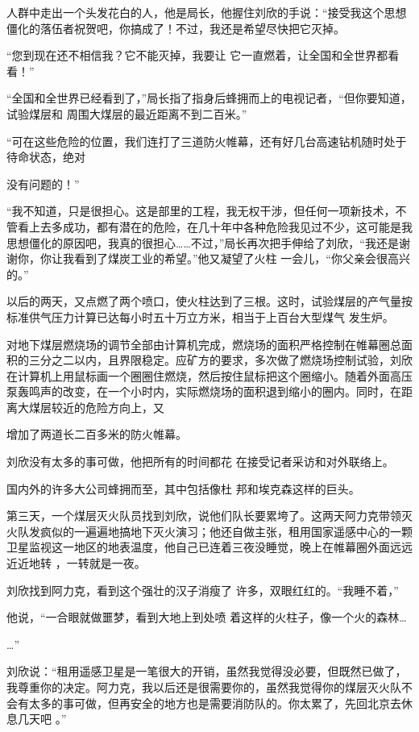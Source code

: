 \documentclass{article}
\begin{document}
人群中走出一个头发花白的人，他是局长，他握住刘欣的手说：“接受我这个思想僵化的落伍者祝贺吧，你搞成了！不过，我还是希望尽快把它灭掉。

“您到现在还不相信我？它不能灭掉，我要让
它一直燃着，让全国和全世界都看看！” 

“全国和全世界已经看到了，”局长指了指身后蜂拥而上的电视记者，“但你要知道，试验煤层和
周围大煤层的最近距离不到二百米。” 

“可在这些危险的位置，我们连打了三道防火帷幕，还有好几台高速钻机随时处于待命状态，绝对

\newpage
没有问题的！” 

“我不知道，只是很担心。这是部里的工程，我无权干涉，但任何一项新技术，不管看上去多成功，都有潜在的危险，在几十年中各种危险我见过不少，这可能是我思想僵化的原因吧，我真的很担心……不过，”局长再次把手伸给了刘欣，“我还是谢谢你，你让我看到了煤炭工业的希望。”他又凝望了火柱
一会儿，“你父亲会很高兴的。” 

以后的两天，又点燃了两个喷口，使火柱达到了三根。这时，试验煤层的产气量按标准供气压力计算已达每小时五十万立方米，相当于上百台大型煤气
发生炉。 

对地下煤层燃烧场的调节全部由计算机完成，燃烧场的面积严格控制在帷幕圈总面积的三分之二以内，且界限稳定。应矿方的要求，多次做了燃烧场控制试验，刘欣在计算机上用鼠标画一个圈圈住燃烧，然后按住鼠标把这个圈缩小。随着外面高压泵轰鸣声的改变，在一个小时内，实际燃烧场的面积退到缩小的圈内。同时，在距离大煤层较近的危险方向上，又
\newpage

增加了两道长二百多米的防火帷幕。 

刘欣没有太多的事可做，他把所有的时间都花
在接受记者采访和对外联络上。 

国内外的许多大公司蜂拥而至，其中包括像杜
邦和埃克森这样的巨头。 

第三天，一个煤层灭火队员找到刘欣，说他们队长要累垮了。这两天阿力克带领灭火队发疯似的一遍遍地搞地下灭火演习；他还自做主张，租用国家遥感中心的一颗卫星监视这一地区的地表温度，他自己已连着三夜没睡觉，晚上在帷幕圈外面远远近近地转
，一转就是一夜。 

刘欣找到阿力克，看到这个强壮的汉子消瘦了
许多，双眼红红的。“我睡不着，” 

他说，“一合眼就做噩梦，看到大地上到处喷
着这样的火柱子，像一个火的森林… 

\newpage


…” 

刘欣说：“租用遥感卫星是一笔很大的开销，虽然我觉得没必要，但既然已做了，我尊重你的决定。阿力克，我以后还是很需要你的，虽然我觉得你的煤层灭火队不会有太多的事可做，但再安全的地方也是需要消防队的。你太累了，先回北京去休息几天吧
。” 
\end{document}
